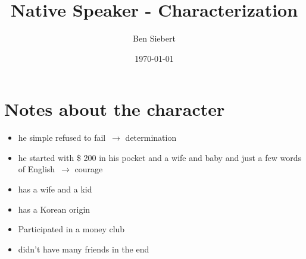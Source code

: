 \documentclass[11pt, a4paper]{report}
\begin{document}
	
	\bsremovechaptertitle
	
	\title{Native Speaker - Characterization}
	\author{Ben Siebert}
	\date{\today}
	\maketitle
	
	\chapter{Notes about the character}
	
	\begin{itemize}
		\item \dq he simple refused to fail\dq\ $\to$ determination
		\item \dq he started with \$ 200 in his pocket and a wife and baby and just a few words of English\dq\ $\to$ courage
		\item has a wife and a kid
		\item has a Korean origin
		\item Participated in a \dq money club\dq
		\item didn't have many friends in the end
	\end{itemize}
\end{document}
